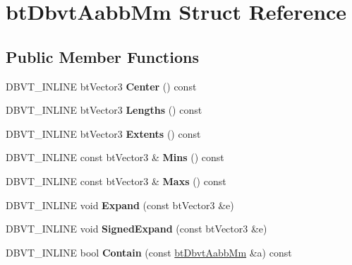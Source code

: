 \hypertarget{structbtDbvtAabbMm}{}\section{bt\+Dbvt\+Aabb\+Mm Struct Reference}
\label{structbtDbvtAabbMm}
\subsection*{Public Member Functions}
\begin{DoxyCompactItemize}
\item 
\mbox{\label{structbtDbvtAabbMm_a9bc59550ceba800557807ea7f72d6f38}} 
D\+B\+V\+T\+\_\+\+I\+N\+L\+I\+NE bt\+Vector3 {\bfseries Center} () const
\item 
\mbox{\label{structbtDbvtAabbMm_ad0adbdb7c01ecd4a677f01382a19177f}} 
D\+B\+V\+T\+\_\+\+I\+N\+L\+I\+NE bt\+Vector3 {\bfseries Lengths} () const
\item 
\mbox{\label{structbtDbvtAabbMm_a703ebccab5b8b4c52b33fc38f8aa0557}} 
D\+B\+V\+T\+\_\+\+I\+N\+L\+I\+NE bt\+Vector3 {\bfseries Extents} () const
\item 
\mbox{\label{structbtDbvtAabbMm_a68e5ce79a4b62f9251406cd97347afa3}} 
D\+B\+V\+T\+\_\+\+I\+N\+L\+I\+NE const bt\+Vector3 \& {\bfseries Mins} () const
\item 
\mbox{\label{structbtDbvtAabbMm_aa9fe9a4b650c2743debf7d73785db838}} 
D\+B\+V\+T\+\_\+\+I\+N\+L\+I\+NE const bt\+Vector3 \& {\bfseries Maxs} () const
\item 
\mbox{\label{structbtDbvtAabbMm_a93bf0a81247ad642fdc6b0213b0ed68b}} 
D\+B\+V\+T\+\_\+\+I\+N\+L\+I\+NE void {\bfseries Expand} (const bt\+Vector3 \&e)
\item 
\mbox{\label{structbtDbvtAabbMm_a182dddf6be4856c35c89057ff8a2d3ee}} 
D\+B\+V\+T\+\_\+\+I\+N\+L\+I\+NE void {\bfseries Signed\+Expand} (const bt\+Vector3 \&e)
\item 
\mbox{\label{structbtDbvtAabbMm_a12c31bd12f551773ab99d0ef46d5f533}} 
D\+B\+V\+T\+\_\+\+I\+N\+L\+I\+NE bool {\bfseries Contain} (const \hyperlink{structbtDbvtAabbMm}{bt\+Dbvt\+Aabb\+Mm} \&a) const

\end{DoxyCompactItemize}
